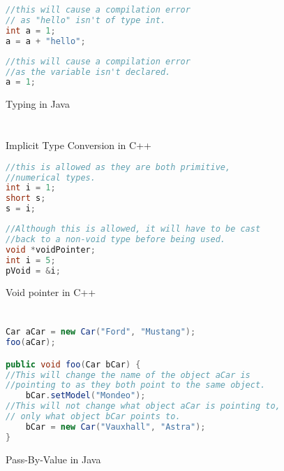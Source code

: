 \documentclass[]{report}
\begin{document}
\appendix
\chapter{}
\begin{figure}[h!]
	\caption{Typing in Java}
	\begin{lstlisting}[language=Java,frame=single]
//this will cause a compilation error
// as "hello" isn't of type int.
int a = 1;
a = a + "hello";
	\end{lstlisting}
	\begin{lstlisting}[language=Java,frame=single]
//this will cause a compilation error
//as the variable isn't declared.
a = 1;
	\end{lstlisting}
\end{figure}

\chapter{}
\begin{figure}[h!]
	\caption{Implicit Type Conversion in C++}
	\begin{lstlisting}[language=C++,frame=single]
//this is allowed as they are both primitive, 
//numerical types.
int i = 1;
short s;
s = i;
	\end{lstlisting}
	\caption{Void pointer in C++}
	\begin{lstlisting}[language=C++,frame=single]
//Although this is allowed, it will have to be cast
//back to a non-void type before being used.
void *voidPointer;
int i = 5;
pVoid = &i; 
	\end{lstlisting}
\end{figure}

\chapter{}
\begin{figure}[h!]
	\caption{Pass-By-Value in Java}
	\begin{lstlisting}[language=Java,frame=single]
Car aCar = new Car("Ford", "Mustang");
foo(aCar);

public void foo(Car bCar) {
//This will change the name of the object aCar is 
//pointing to as they both point to the same object.
	bCar.setModel("Mondeo");
//This will not change what object aCar is pointing to,
// only what object bCar points to.
	bCar = new Car("Vauxhall", "Astra");
}
	\end{lstlisting}
\end{figure}
\end{document}
